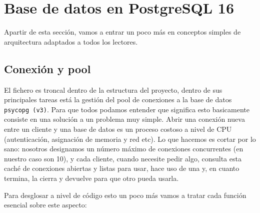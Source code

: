 \documentclass[12pt, a4paper]{article}
\begin{document}
\section{Base de datos en PostgreSQL 16}

Apartir de esta sección, vamos a entrar un poco más en conceptos simples de arquitectura adaptados a todos los lectores.

\subsection{Conexión y pool}

El fichero  es troncal dentro de la estructura del proyecto, dentro de sus principales tareas está la gestión del pool de conexiones a la base de datos \texttt{psycopg (v3)}. Para que todos podamos entender que significa esto basicamente consiste en una solución a un problema muy simple. Abrir una conexión nueva entre un cliente y una base de datos es un proceso costoso a nivel de CPU (autenticación, asignación de memoria y red etc). Lo que hacemos es cortar por lo sano: nosotros designamos un número máximo de conexiones concurrentes (en nuestro caso son 10), y cada cliente, cuando necesite pedir algo, consulta esta caché de conexiones abiertas y listas para usar, hace uso de una y, en cuanto termina, la cierra y devuelve para que otro pueda usarla.

Para desglosar a nivel de código esto un poco más vamos a tratar cada función esencial sobre este aspecto:
\end{document}
